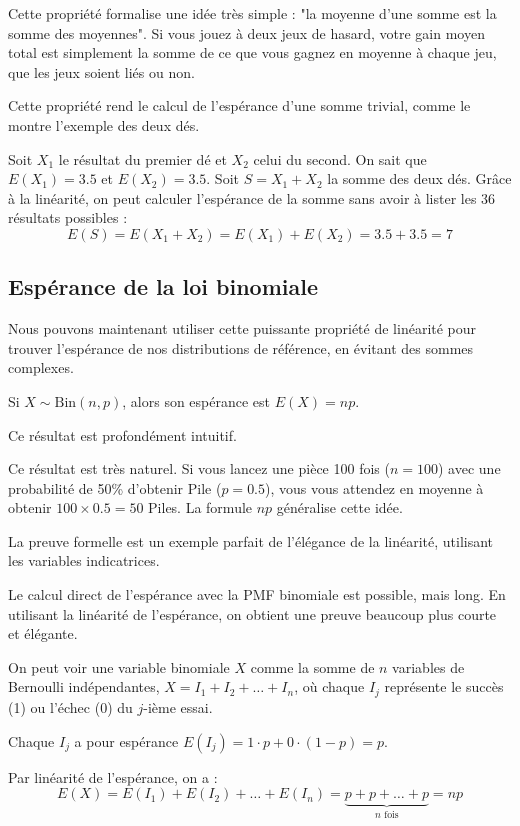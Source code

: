 \begin{intuitionbox}
Cette propriété formalise une idée très simple : "la moyenne d'une somme est la somme des moyennes". Si vous jouez à deux jeux de hasard, votre gain moyen total est simplement la somme de ce que vous gagnez en moyenne à chaque jeu, que les jeux soient liés ou non.
\end{intuitionbox}

Cette propriété rend le calcul de l'espérance d'une somme trivial, comme le montre l'exemple des deux dés.

\begin{examplebox}
Soit $X_1$ le résultat du premier dé et $X_2$ celui du second. On sait que $E(X_1) = 3.5$ et $E(X_2) = 3.5$.
Soit $S = X_1 + X_2$ la somme des deux dés. Grâce à la linéarité, on peut calculer l'espérance de la somme sans avoir à lister les 36 résultats possibles :
$$E(S) = E(X_1 + X_2) = E(X_1) + E(X_2) = 3.5 + 3.5 = 7$$
\end{examplebox}

\subsection{Espérance de la loi binomiale}

Nous pouvons maintenant utiliser cette puissante propriété de linéarité pour trouver l'espérance de nos distributions de référence, en évitant des sommes complexes.

\begin{theorembox}
Si $X \sim \text{Bin}(n, p)$, alors son espérance est $E(X) = np$.
\end{theorembox}

Ce résultat est profondément intuitif.

\begin{intuitionbox}
Ce résultat est très naturel. Si vous lancez une pièce 100 fois ($n=100$) avec une probabilité de 50\% d'obtenir Pile ($p=0.5$), vous vous attendez en moyenne à obtenir $100 \times 0.5 = 50$ Piles. La formule $np$ généralise cette idée.
\end{intuitionbox}

La preuve formelle est un exemple parfait de l'élégance de la linéarité, utilisant les variables indicatrices.

\begin{proofbox}
Le calcul direct de l'espérance avec la PMF binomiale est possible, mais long. En utilisant la linéarité de l'espérance, on obtient une preuve beaucoup plus courte et élégante.

On peut voir une variable binomiale $X$ comme la somme de $n$ variables de Bernoulli indépendantes, $X = I_1 + I_2 + \dots + I_n$, où chaque $I_j$ représente le succès (1) ou l'échec (0) du $j$-ième essai.

Chaque $I_j$ a pour espérance $E(I_j) = 1 \cdot p + 0 \cdot (1-p) = p$.

Par linéarité de l'espérance, on a :
$$E(X) = E(I_1) + E(I_2) + \dots + E(I_n) = \underbrace{p + p + \dots + p}_{n \text{ fois}} = np$$
\end{proofbox}

